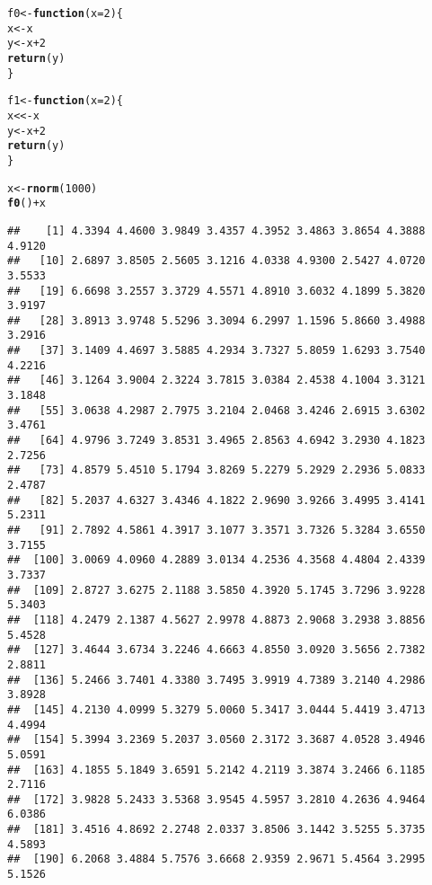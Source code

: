 \documentclass[12pt,a4paper]{scrartcl}\usepackage[]{graphicx}\usepackage[]{color}
\makeatletter
\newcommand{\hlnum}[1]{\textcolor[rgb]{0.686,0.059,0.569}{#1}}%
\newcommand{\hlopt}[1]{\textcolor[rgb]{0,0,0}{#1}}%
\newcommand{\hlstd}[1]{\textcolor[rgb]{0.345,0.345,0.345}{#1}}%
\newcommand{\hlkwa}[1]{\textcolor[rgb]{0.161,0.373,0.58}{\textbf{#1}}}%
\newcommand{\hlkwb}[1]{\textcolor[rgb]{0.69,0.353,0.396}{#1}}%
\newcommand{\hlkwc}[1]{\textcolor[rgb]{0.333,0.667,0.333}{#1}}%
\newcommand{\hlkwd}[1]{\textcolor[rgb]{0.737,0.353,0.396}{\textbf{#1}}}%
\newenvironment{kframe}{%
 \def\at@end@of@kframe{}%
 \ifinner\ifhmode%
  \def\at@end@of@kframe{\end{minipage}}%
  \begin{minipage}{\columnwidth}%
 \fi\fi%
 \def\FrameCommand##1{\hskip\@totalleftmargin \hskip-\fboxsep
 \colorbox{shadecolor}{##1}\hskip-\fboxsep
     \hskip-\linewidth \hskip-\@totalleftmargin \hskip\columnwidth}%
 \MakeFramed {\advance\hsize-\width
   \@totalleftmargin\z@ \linewidth\hsize
   \@setminipage}}%
 {\par\unskip\endMakeFramed%
 \at@end@of@kframe}
\newenvironment{knitrout}{}{} %
\makeatother
\begin{document}
\begin{Exercise}[difficulty=1, title={Understand the \texttt{<<-}}]
\begin{knitrout}
\color{fgcolor}\begin{kframe}
\begin{alltt}
\hlstd{f0} \hlkwb{<-} \hlkwa{function}\hlstd{(}\hlkwc{x}\hlstd{=}\hlnum{2}\hlstd{)\{}
  \hlstd{x} \hlkwb{<-} \hlstd{x}
  \hlstd{y} \hlkwb{<-} \hlstd{x}\hlopt{+}\hlnum{2}
  \hlkwd{return}\hlstd{(y)}
\hlstd{\}}

\hlstd{f1} \hlkwb{<-} \hlkwa{function}\hlstd{(}\hlkwc{x}\hlstd{=}\hlnum{2}\hlstd{)\{}
  \hlstd{x} \hlkwb{<<-} \hlstd{x}
  \hlstd{y} \hlkwb{<-} \hlstd{x}\hlopt{+}\hlnum{2}
  \hlkwd{return}\hlstd{(y)}
\hlstd{\}}

\hlstd{x} \hlkwb{<-} \hlkwd{rnorm}\hlstd{(}\hlnum{1000}\hlstd{)}
\hlkwd{f0}\hlstd{()}\hlopt{+}\hlstd{x}
\end{alltt}
\begin{verbatim}
##    [1] 4.3394 4.4600 3.9849 3.4357 4.3952 3.4863 3.8654 4.3888 4.9120
##   [10] 2.6897 3.8505 2.5605 3.1216 4.0338 4.9300 2.5427 4.0720 3.5533
##   [19] 6.6698 3.2557 3.3729 4.5571 4.8910 3.6032 4.1899 5.3820 3.9197
##   [28] 3.8913 3.9748 5.5296 3.3094 6.2997 1.1596 5.8660 3.4988 3.2916
##   [37] 3.1409 4.4697 3.5885 4.2934 3.7327 5.8059 1.6293 3.7540 4.2216
##   [46] 3.1264 3.9004 2.3224 3.7815 3.0384 2.4538 4.1004 3.3121 3.1848
##   [55] 3.0638 4.2987 2.7975 3.2104 2.0468 3.4246 2.6915 3.6302 3.4761
##   [64] 4.9796 3.7249 3.8531 3.4965 2.8563 4.6942 3.2930 4.1823 2.7256
##   [73] 4.8579 5.4510 5.1794 3.8269 5.2279 5.2929 2.2936 5.0833 2.4787
##   [82] 5.2037 4.6327 3.4346 4.1822 2.9690 3.9266 3.4995 3.4141 5.2311
##   [91] 2.7892 4.5861 4.3917 3.1077 3.3571 3.7326 5.3284 3.6550 3.7155
##  [100] 3.0069 4.0960 4.2889 3.0134 4.2536 4.3568 4.4804 2.4339 3.7337
##  [109] 2.8727 3.6275 2.1188 3.5850 4.3920 5.1745 3.7296 3.9228 5.3403
##  [118] 4.2479 2.1387 4.5627 2.9978 4.8873 2.9068 3.2938 3.8856 5.4528
##  [127] 3.4644 3.6734 3.2246 4.6663 4.8550 3.0920 3.5656 2.7382 2.8811
##  [136] 5.2466 3.7401 4.3380 3.7495 3.9919 4.7389 3.2140 4.2986 3.8928
##  [145] 4.2130 4.0999 5.3279 5.0060 5.3417 3.0444 5.4419 3.4713 4.4994
##  [154] 5.3994 3.2369 5.2037 3.0560 2.3172 3.3687 4.0528 3.4946 5.0591
##  [163] 4.1855 5.1849 3.6591 5.2142 4.2119 3.3874 3.2466 6.1185 2.7116
##  [172] 3.9828 5.2433 3.5368 3.9545 4.5957 3.2810 4.2636 4.9464 6.0386
##  [181] 3.4516 4.8692 2.2748 2.0337 3.8506 3.1442 3.5255 5.3735 4.5893
##  [190] 6.2068 3.4884 5.7576 3.6668 2.9359 2.9671 5.4564 3.2995 5.1526

\end{verbatim}
\end{kframe}
\end{knitrout}
\end{Exercise}
\end{document}
